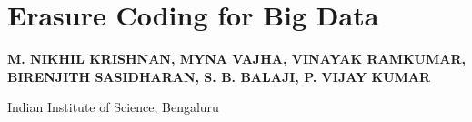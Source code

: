 \chapter{Erasure Coding for Big Data}

\begin{center}
{\large\bfseries\uppercase{M. Nikhil Krishnan, Myna Vajha, Vinayak Ramkumar},\\[5pt]
\uppercase{Birenjith Sasidharan, S. B. Balaji, P. Vijay Kumar}}
\smallskip

Indian Institute of Science, Bengaluru 
\end{center}

\vfill



\vfill
\eject


